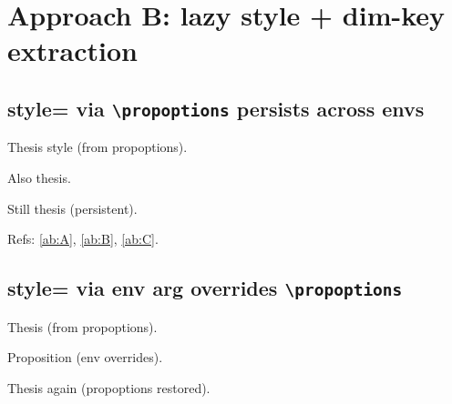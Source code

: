 \documentclass{article}
\begin{document}
\section{Approach B: lazy style + dim-key extraction}


\subsection{style= via \texttt{\textbackslash propoptions} persists across envs}



\begin{prop}
  \item[Claim A] Thesis style (from propoptions). \label{ab:A}
  \item[Claim B] Also thesis. \label{ab:B}
\end{prop}

\begin{prop}
  \item[Claim C] Still thesis (persistent). \label{ab:C}
\end{prop}


Refs: \ref{ab:A}, \ref{ab:B}, \ref{ab:C}.

\subsection{style= via env arg overrides \texttt{\textbackslash propoptions}}



\begin{prop}
  \item[Claim D] Thesis (from propoptions). \label{ab:D}
\end{prop}
\begin{prop}[style=proposition]
  \item[Claim E] Proposition (env overrides). \label{ab:E}
\end{prop}
\begin{prop}
  \item[Claim F] Thesis again (propoptions restored). \label{ab:F}
\end{prop}
\end{document}
